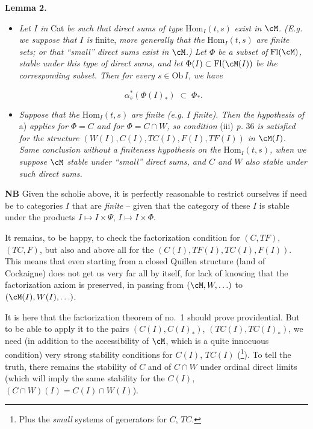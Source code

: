 \textbf{Lemma 2.}

\begin{itemize}[leftmargin=3em]
\item[a)] \textit{Let $I$ in} Cat \textit{be such that direct sums of type} $\mathrm{Hom}_I(t,s)$ \textit{exist in $\cM$. (E.g. we suppose that $I$ is} finite, \textit{more generally that the} $\mathrm{Hom}_I(t,s)$ \textit{are finite sets; or that ``small'' direct sums exist in $\cM$.) Let $\Phi$ be a subset of} $\mathrm{Fl}(\cM)$\textit{, stable under this type of direct sums, and let} $\Phi(I)\subset\mathrm{Fl}(\cM(I))$ \textit{be the corresponding subset. Then for every $s\in\mathrm{Ob}\,I$, we have}

\[
\alpha_s^*(\Phi(I)_*) \;\subset\; \Phi_*.
\]
\item[b)] \textit{Suppose that the} $\mathrm{Hom}_I(t,s)$ \textit{are finite (e.g. $I$ finite). Then the hypothesis of} a) \textit{applies for $\Phi=C$ and for $\Phi=C{\cap}W$, so condition} (iii) \textit{p.} 36 \textit{is satisfied for the structure $(W(I),C(I),TC(I),F(I),TF(I))$ in $\cM(I)$. Same conclusion without a finiteness hypothesis on the} $\mathrm{Hom}_I(t,s)$\textit{, when we suppose $\cM$ stable under ``small'' direct sums, and $C$ and $W$ also stable under such direct sums.}
\end{itemize}

\textbf{NB} Given the scholie above, it is perfectly reasonable to restrict ourselves if need be to categories $I$ that are \textit{finite} – given that the category of these $I$ is stable under the products $I\longmapsto I\times\Psi$, $I\longmapsto I\times\Phi$.

It remains, to be happy, to check the factorization condition  for $(C,TF)$, $(TC,F)$, but also and above all for the $(C(I),TF(I),TC(I),F(I))$. This means that even starting from a closed Quillen structure (land of Cockaigne)
does not get us very far all by itself, for lack of knowing that the factorization axiom is preserved, in passing from $(\cM,W,\ldots)$ to $(\cM(I),W(I),\ldots)$.

It is here that the factorization theorem of no.~1 should prove providential. But to be able to apply it to the pairs $(C(I),C(I)_*)$, $(TC(I),TC(I)_*)$, we need (in addition to the accessibility of $\cM$, which is a quite innocuous condition) very strong stability conditions for $C(I)$, $TC(I)$ (\footnote{Plus the \textit{small} systems of generators for $C$, $TC$.}). To tell the truth, there remains the stability of $C$ and of $C\cap W$ under ordinal direct limits (which will imply the same stability for the $C(I)$, $(C{\cap}W)(I) = C(I){\cap}W(I)$).

